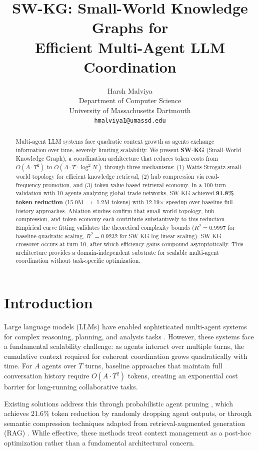 \documentclass[11pt]{article}
\title{\textbf{SW-KG: Small-World Knowledge Graphs for\\Efficient Multi-Agent LLM Coordination}}
\author{
  Harsh Malviya \\
  Department of Computer Science \\
  University of Massachusetts Dartmouth \\
  \texttt{hmalviya1@umassd.edu}
}
\date{}
\begin{document}
\maketitle

\begin{abstract}
Multi-agent LLM systems face quadratic context growth as agents exchange information over time, severely limiting scalability. We present \textbf{SW-KG} (Small-World Knowledge Graph), a coordination architecture that reduces token costs from $O(A \cdot T^2)$ to $O(A \cdot T \cdot \log^2 N)$ through three mechanisms: (1) Watts-Strogatz small-world topology for efficient knowledge retrieval, (2) hub compression via read-frequency promotion, and (3) token-value-based retrieval economy. In a 100-turn validation with 10 agents analyzing global trade networks, SW-KG achieved \textbf{91.8\% token reduction} (15.0M $\rightarrow$ 1.2M tokens) with 12.19$\times$ speedup over baseline full-history approaches. Ablation studies confirm that small-world topology, hub compression, and token economy each contribute substantively to this reduction. Empirical curve fitting validates the theoretical complexity bounds ($R^2 = 0.9997$ for baseline quadratic scaling, $R^2 = 0.9232$ for SW-KG log-linear scaling). SW-KG crossover occurs at turn 10, after which efficiency gains compound asymptotically. This architecture provides a domain-independent substrate for scalable multi-agent coordination without task-specific optimization.
\end{abstract}

\section{Introduction}

Large language models (LLMs) have enabled sophisticated multi-agent systems for complex reasoning, planning, and analysis tasks \cite{autogen,metagpt,camel}. However, these systems face a fundamental scalability challenge: as agents interact over multiple turns, the cumulative context required for coherent coordination grows quadratically with time. For $A$ agents over $T$ turns, baseline approaches that maintain full conversation history require $O(A \cdot T^2)$ tokens, creating an exponential cost barrier for long-running collaborative tasks.

Existing solutions address this through probabilistic agent pruning \cite{agentdropout}, which achieves 21.6\% token reduction by randomly dropping agent outputs, or through semantic compression techniques adapted from retrieval-augmented generation (RAG) \cite{graphrag}. While effective, these methods treat context management as a post-hoc optimization rather than a fundamental architectural concern.
\end{document}
